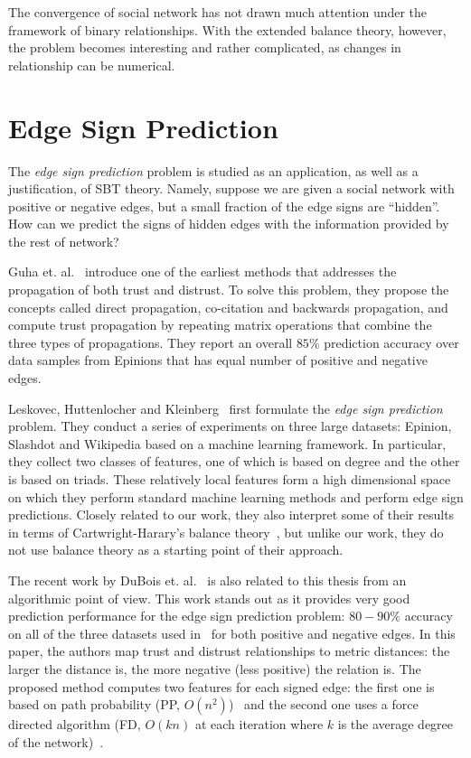 The convergence of social network has not drawn much attention under the framework of binary relationships. With the extended balance theory, however, the problem becomes interesting and rather complicated, as changes in relationship can be numerical. 
\section{Edge Sign Prediction}
The {\it edge sign prediction} problem is studied as an application, as well as a justification, of SBT theory. Namely, suppose we are given a social network with positive or negative edges, but a
small fraction of the edge signs are ``hidden''. How can we predict
the signs of hidden edges with the information provided by the rest of network?

Guha et. al.~\cite{Guha:04} introduce one of the earliest methods that
addresses the propagation of both trust and distrust. To solve this problem, they propose the
concepts called direct propagation, co-citation and backwards propagation,
and compute trust propagation by repeating matrix operations that
combine the three types of propagations. They report an overall $85\%$
prediction accuracy over data samples from Epinions that has equal
number of positive and negative edges.

Leskovec, Huttenlocher and Kleinberg~\cite{Leskovec:2010} first formulate the {\it edge sign prediction} problem. They conduct a series of experiments on three large datasets: Epinion, Slashdot and
Wikipedia based on a machine learning framework. In particular, they collect two classes of features, one of
which is based on degree and the other is based on triads. These
relatively local features form a high dimensional space on which they
perform standard machine learning methods and perform edge sign
predictions. Closely related to our work, they also interpret some of
their results in terms of Cartwright-Harary's balance
theory~\cite{Cartwright:56}, but unlike our work, they do not use
balance theory as a starting point of their approach.

The recent work by DuBois et. al.~\cite{golbeck:distrust2011} is also
related to this thesis from an algorithmic point of view. This work
stands out as it provides very good prediction performance for the
edge sign prediction problem: $80-90 \%$ accuracy on all of the three datasets
used in~\cite{Leskovec:2010} for both positive and negative edges. In
this paper, the authors map trust and distrust relationships to metric
distances: the larger the distance is, the more negative (less
positive) the relation is. The proposed method computes two
features for each signed edge: the first one is based on path
probability (PP, $O(n^2)$)~\cite{DuBois:2009} and the second one uses
a force directed algorithm (FD, $O(kn)$ at each iteration where $k$ is
the average degree of the network)~\cite{golbeck:distrust2011}. 

